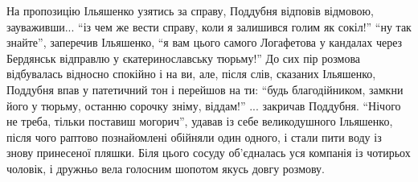 \documentclass[a4paper,20pt]{report}
\begin{document}
На пропозицію Ільяшенко узятись за справу, Поддубня відповів відмовою, зауваживши...
``із чем же вести справу, коли я залишився голим як сокіл!'' ``ну так знайте'', заперечив Ільяшенко,
``я вам цього самого Логафетова у кандалах через Бердянськ відправлю у єкатеринославську тюрьму!''
До сих пір розмова відбувалась відносно спокійно і на ви, але, після слів, сказаних Ільяшенко, Поддубня 
впав у патетичний тон і перейшов на ти:
``будь благодійником, замкни його у тюрьму, останню сорочку зніму, віддам!'' ... закричав Поддубня. ``Нічого не треба,
тільки поставиш могорич'', удавав із себе великодушного Ільяшенко,
після чого раптово познайомлені обійняли один одного, і стали пити воду із знову принесеної пляшки. Біля цього
сосуду об'єдналась уся компанія із чотирьох чоловік, і дружньо вела голосним шопотом якусь довгу розмову.
\end{document}
